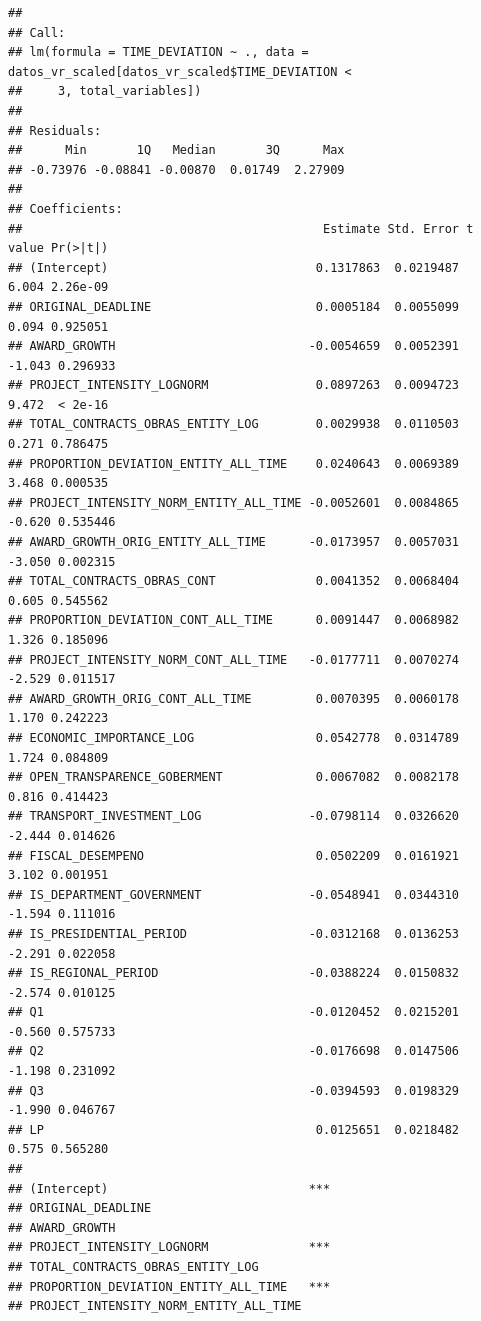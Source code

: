 \documentclass[
]{article}
\begin{document}
\begin{verbatim}
## 
## Call:
## lm(formula = TIME_DEVIATION ~ ., data = datos_vr_scaled[datos_vr_scaled$TIME_DEVIATION < 
##     3, total_variables])
## 
## Residuals:
##      Min       1Q   Median       3Q      Max 
## -0.73976 -0.08841 -0.00870  0.01749  2.27909 
## 
## Coefficients:
##                                          Estimate Std. Error t value Pr(>|t|)
## (Intercept)                             0.1317863  0.0219487   6.004 2.26e-09
## ORIGINAL_DEADLINE                       0.0005184  0.0055099   0.094 0.925051
## AWARD_GROWTH                           -0.0054659  0.0052391  -1.043 0.296933
## PROJECT_INTENSITY_LOGNORM               0.0897263  0.0094723   9.472  < 2e-16
## TOTAL_CONTRACTS_OBRAS_ENTITY_LOG        0.0029938  0.0110503   0.271 0.786475
## PROPORTION_DEVIATION_ENTITY_ALL_TIME    0.0240643  0.0069389   3.468 0.000535
## PROJECT_INTENSITY_NORM_ENTITY_ALL_TIME -0.0052601  0.0084865  -0.620 0.535446
## AWARD_GROWTH_ORIG_ENTITY_ALL_TIME      -0.0173957  0.0057031  -3.050 0.002315
## TOTAL_CONTRACTS_OBRAS_CONT              0.0041352  0.0068404   0.605 0.545562
## PROPORTION_DEVIATION_CONT_ALL_TIME      0.0091447  0.0068982   1.326 0.185096
## PROJECT_INTENSITY_NORM_CONT_ALL_TIME   -0.0177711  0.0070274  -2.529 0.011517
## AWARD_GROWTH_ORIG_CONT_ALL_TIME         0.0070395  0.0060178   1.170 0.242223
## ECONOMIC_IMPORTANCE_LOG                 0.0542778  0.0314789   1.724 0.084809
## OPEN_TRANSPARENCE_GOBERMENT             0.0067082  0.0082178   0.816 0.414423
## TRANSPORT_INVESTMENT_LOG               -0.0798114  0.0326620  -2.444 0.014626
## FISCAL_DESEMPENO                        0.0502209  0.0161921   3.102 0.001951
## IS_DEPARTMENT_GOVERNMENT               -0.0548941  0.0344310  -1.594 0.111016
## IS_PRESIDENTIAL_PERIOD                 -0.0312168  0.0136253  -2.291 0.022058
## IS_REGIONAL_PERIOD                     -0.0388224  0.0150832  -2.574 0.010125
## Q1                                     -0.0120452  0.0215201  -0.560 0.575733
## Q2                                     -0.0176698  0.0147506  -1.198 0.231092
## Q3                                     -0.0394593  0.0198329  -1.990 0.046767
## LP                                      0.0125651  0.0218482   0.575 0.565280
##                                           
## (Intercept)                            ***
## ORIGINAL_DEADLINE                         
## AWARD_GROWTH                              
## PROJECT_INTENSITY_LOGNORM              ***
## TOTAL_CONTRACTS_OBRAS_ENTITY_LOG          
## PROPORTION_DEVIATION_ENTITY_ALL_TIME   ***
## PROJECT_INTENSITY_NORM_ENTITY_ALL_TIME    

\end{verbatim}
\end{document}
